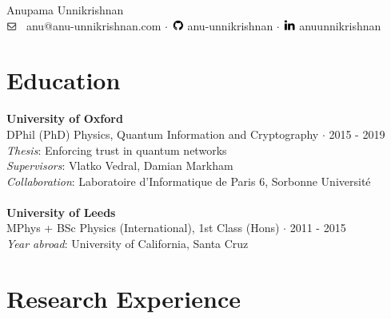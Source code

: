 \documentclass[12pt,a4paper]{article}
\newcommand{\middot}{\boldsymbol{\cdot}}
\begin{document}
\begin{center}
\fontsize{35pt}{50pt} \selectfont 
Anupama Unnikrishnan \\ 
\small \vspace{2mm}
\includegraphics[trim = 0mm 25mm 25mm 0mm, width = 3.5mm]{email.png} \ anu@anu-unnikrishnan.com $\middot$
\includegraphics[trim = 0mm 10mm 0mm 0mm, width = 4mm]{github.png} anu-unnikrishnan $\middot$ 
\includegraphics[trim = 0mm 10mm 0mm 0mm, width = 4mm]{linkedin.png} anuunnikrishnan \\
\end{center}
\normalsize

\vspace{2mm}

\section*{Education \sout{\hfill} }

\vspace{2mm}

\textbf{University of Oxford}  \\
DPhil (PhD) Physics, Quantum Information and Cryptography $\middot$ 2015 - 2019 \\
\textit{Thesis}: Enforcing trust in quantum networks \\
\textit{Supervisors}: Vlatko Vedral, Damian Markham \\ 
\textit{Collaboration}: Laboratoire d'Informatique de Paris 6, Sorbonne Universit\'e \\ \\ 
\textbf{University of Leeds} \\
MPhys + BSc Physics (International), 1st Class (Hons) $\middot$ 2011 - 2015 \\
\textit{Year abroad}: University of California, Santa Cruz 

\vspace{2mm}

\section*{Research Experience \sout{\hfill} }
\end{document}
